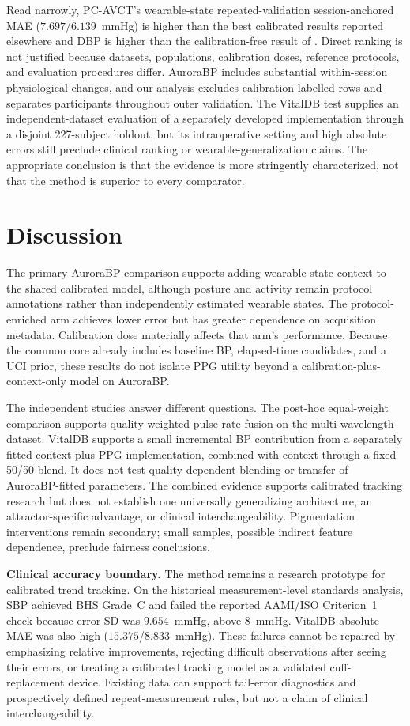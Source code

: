 \documentclass[journal]{IEEEtran}
\begin{document}
Read narrowly, PC-AVCT's wearable-state repeated-validation session-anchored MAE ($7.697$/$6.139$~mmHg) is higher than the best calibrated results reported elsewhere and DBP is higher than the calibration-free result of \cite{calfree2023}. Direct ranking is not justified because datasets, populations, calibration doses, reference protocols, and evaluation procedures differ. AuroraBP includes substantial within-session physiological changes, and our analysis excludes calibration-labelled rows and separates participants throughout outer validation. The VitalDB test supplies an independent-dataset evaluation of a separately developed implementation through a disjoint 227-subject holdout, but its intraoperative setting and high absolute errors still preclude clinical ranking or wearable-generalization claims. The appropriate conclusion is that the evidence is more stringently characterized, not that the method is superior to every comparator.
\section{Discussion}
\label{sec:discussion}
The primary AuroraBP comparison supports adding wearable-state context to the shared calibrated model, although posture and activity remain protocol annotations rather than independently estimated wearable states. The protocol-enriched arm achieves lower error but has greater dependence on acquisition metadata. Calibration dose materially affects that arm's performance. Because the common core already includes baseline BP, elapsed-time candidates, and a UCI prior, these results do not isolate PPG utility beyond a calibration-plus-context-only model on AuroraBP.

The independent studies answer different questions. The post-hoc equal-weight comparison supports quality-weighted pulse-rate fusion on the multi-wavelength dataset. VitalDB supports a small incremental BP contribution from a separately fitted context-plus-PPG implementation, combined with context through a fixed 50/50 blend. It does not test quality-dependent blending or transfer of AuroraBP-fitted parameters. The combined evidence supports calibrated tracking research but does not establish one universally generalizing architecture, an attractor-specific advantage, or clinical interchangeability. Pigmentation interventions remain secondary; small samples, possible indirect feature dependence, preclude fairness conclusions.

\textbf{Clinical accuracy boundary.} The method remains a research prototype for calibrated trend tracking. On the historical measurement-level standards analysis, SBP achieved BHS Grade~C and failed the reported AAMI/ISO Criterion~1 check because error SD was $9.654$~mmHg, above $8$~mmHg. VitalDB absolute MAE was also high ($15.375$/$8.833$~mmHg). These failures cannot be repaired by emphasizing relative improvements, rejecting difficult observations after seeing their errors, or treating a calibrated tracking model as a validated cuff-replacement device. Existing data can support tail-error diagnostics and prospectively defined repeat-measurement rules, but not a claim of clinical interchangeability.
\end{document}
